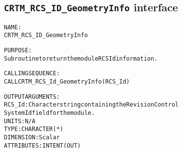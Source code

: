 \subsection{\texttt{CRTM\_RCS\_ID\_GeometryInfo} interface}
  \label{sec:CRTM_RCS_ID_GeometryInfo_interface}
  \begin{alltt}
 
  NAME:
        CRTM_RCS_ID_GeometryInfo
 
  PURPOSE:
        Subroutine to return the module RCS Id information.
 
  CALLING SEQUENCE:
        CALL CRTM_RCS_Id_GeometryInfo( RCS_Id )
 
  OUTPUT ARGUMENTS:
        RCS_Id:        Character string containing the Revision Control
                       System Id field for the module.
                       UNITS:      N/A
                       TYPE:       CHARACTER(*)
                       DIMENSION:  Scalar
                       ATTRIBUTES: INTENT(OUT)
 
  \end{alltt}
